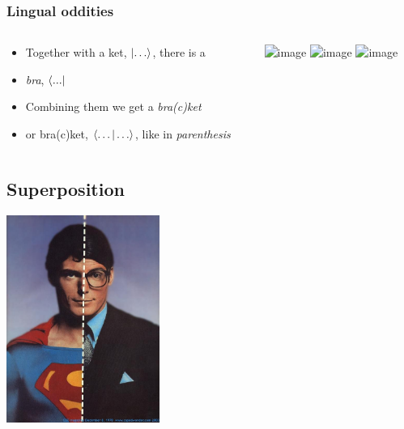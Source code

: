 \documentclass[10pt]{beamer}
\begin{document}
  \begin{frame}
    \frametitle{Lingual oddities}
    \begin{columns}
      \begin{column}{0.5\linewidth}
        \begin{itemize}
        \item<1-> Together with a ket, $\ket{\dots}$, there is a 
        \item<2-> \emph{bra}, $\bra{...}$
        \item<3-> Combining them we get a \emph{bra(c)ket}
        \item<4-> or bra(c)ket, $\braket{\dots | \dots}$, like in \emph{parenthesis}
        \end{itemize}
      \end{column}
      \begin{column}{0.4\linewidth}
        \centering
        \includegraphics<2>[width=4cm]{img/bra.jpg}
        \includegraphics<3>[width=4cm]{img/braces.png}
        \includegraphics<4->[width=1cm]{img/brackets.png}
      \end{column}
    \end{columns}
  \end{frame}

\begin{frame}
\section{Superposition}
\centering
\includegraphics[width=5cm]{img/superman.jpg}
\end{frame}
\end{document}
